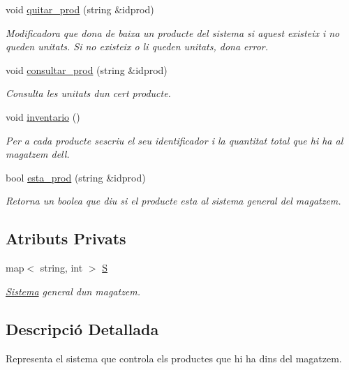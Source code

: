 \begin{DoxyCompactItemize}
void \hyperlink{class_sistema_a3b4d4ae67bca320f0afc82f26433d85b}{quitar\+\_\+prod} (string \&idprod)
\begin{DoxyCompactList}\small\item\em Modificadora que dona de baixa un producte del sistema si aquest existeix i no queden unitats. Si no existeix o li queden unitats, dona error. \end{DoxyCompactList}\item 
void \hyperlink{class_sistema_a41536e95e8d3805116ba4b03ef5ed915}{consultar\+\_\+prod} (string \&idprod)
\begin{DoxyCompactList}\small\item\em Consulta les unitats d\textquotesingle{}un cert producte. \end{DoxyCompactList}\item 
void \hyperlink{class_sistema_a0efdf7e6792aca4405152f480d73f817}{inventario} ()
\begin{DoxyCompactList}\small\item\em Per a cada producte s\textquotesingle{}escriu el seu identificador i la quantitat total que hi ha al magatzem d\textquotesingle{}ell. \end{DoxyCompactList}\item 
bool \hyperlink{class_sistema_ae9d3be838b19599377f66e0276cbdda8}{esta\+\_\+prod} (string \&idprod)
\begin{DoxyCompactList}\small\item\em Retorna un boolea que diu si el producte esta al sistema general del magatzem. \end{DoxyCompactList}\end{DoxyCompactItemize}
\subsection*{Atributs Privats}
\begin{DoxyCompactItemize}
\item 
map$<$ string, int $>$ \hyperlink{class_sistema_ad661bd526f622b1a3c4a0688b010eea2}{S}
\begin{DoxyCompactList}\small\item\em \hyperlink{class_sistema}{Sistema} general d\textquotesingle{}un magatzem. \end{DoxyCompactList}\end{DoxyCompactItemize}


\subsection{Descripció Detallada}
Representa el sistema que controla els productes que hi ha dins del magatzem. 


